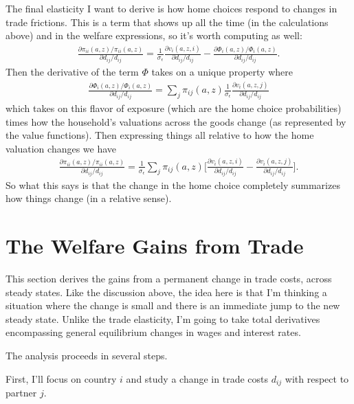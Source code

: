 \documentclass[12pt,pdftex]{article}
\begin{document}
\begin{onehalfspacing}
The final elasticity I want to derive is how home choices respond to changes in trade frictions. This is a term that shows up all the time (in the calculations above) and in the welfare expressions, so it's worth computing as well:
\begin{align}
\frac{\partial \pi_{ii}(a,z) / \pi_{ii}(a,z) }{\partial d_{ij} / d_{ij}} = \frac{1}{\sigma_{\epsilon}}\frac{\partial v_{i}(a,z,i)}{\partial d_{ij}/d_{ij}} - \frac{\partial \Phi_{i}(a,z) / \Phi_{i}(a,z)}{\partial d_{ij}/d_{ij}}.
\end{align}
Then the derivative of the term $\Phi$ takes on a unique property where
\begin{align}
\frac{\partial \Phi_{i}(a,z) / \Phi_{i}(a,z)}{\partial d_{ij}/d_{ij}} = \sum_{j} \pi_{ij}(a,z) \frac{1}{\sigma_{\epsilon}}\frac{\partial v_{i}(a,z,j)}{\partial d_{ij}/d_{ij}}
\end{align}
which takes on this flavor of exposure (which are the home choice probabilities) times how the household's valuations across the goods change (as represented by the value functions). Then expressing things all relative to how the home valuation changes we have
\begin{align}
\frac{\partial \pi_{ii}(a,z) / \pi_{ii}(a,z) }{\partial d_{ij} / d_{ij}} = \frac{1}{\sigma_{\epsilon}} \sum_{j} \pi_{ij}(a,z) \bigg[ \frac{\partial v_{i}(a,z,i)}{\partial d_{ij}/d_{ij}} - \frac{\partial v_{i}(a,z,j)}{\partial d_{ij}/d_{ij}} \bigg].
\label{eq:apx-change-home-choice}
\end{align}
So what this says is that the change in the home choice completely summarizes how things change (in a relative sense).

\section{The Welfare Gains from Trade}\label{apx-sec:gains-trade}

This section derives the gains from a permanent change in trade costs, across steady states. Like the discussion above, the idea here is that I'm thinking a situation where the change is small and there is an immediate jump to the new steady state. Unlike the trade elasticity, I'm going to take total derivatives encompassing general equilibrium changes in wages and interest rates.

The analysis proceeds in several steps.

First, I'll focus on country $i$ and study a change in trade costs $d_{ij}$ with respect to partner $j$.


\end{onehalfspacing}
\end{document}
